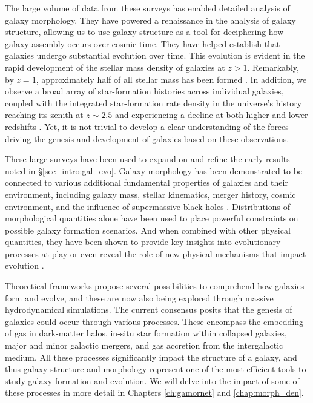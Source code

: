The large volume of data from these surveys has enabled detailed analysis of galaxy morphology. They have powered a renaissance in the analysis of galaxy structure, allowing us to use galaxy structure as a tool for deciphering how galaxy assembly occurs over cosmic time. They have helped establish that galaxies undergo substantial evolution over time. This evolution is evident in the rapid development of the stellar mass density of galaxies at $z > 1$. Remarkably, by $z = 1$, approximately half of all stellar mass has been formed \citep[e.g.,][]{bundy_05,mortlock_11}. In addition, we observe a broad array of star-formation histories across individual galaxies, coupled with the integrated star-formation rate density in the universe's history reaching its zenith at $z \sim 2.5$ and experiencing a decline at both higher and lower redshifts \citep[e.g.,][]{shapely_11, madau_dickinson_14}. Yet, it is not trivial to develop  a clear understanding of the forces driving the genesis and development of galaxies based on these observations. 

These large surveys have been used to expand on and refine the early results noted in \S \ref{sec_intro:gal_evo}. Galaxy morphology has been demonstrated to be connected to various additional fundamental properties of galaxies and their environment, including galaxy mass, stellar kinematics, merger history, cosmic environment, and the influence of supermassive black holes \citep[e.g.,][]{Tremaine2002TheCorrelation, pozzetti_10, wuyts_11, Huertas-Company2016MassCANDELS,powell_17, shimakawa_2021, Dimauro2022CoincidenceGrowth}. Distributions of morphological quantities alone have been used to place powerful constraints on possible galaxy formation scenarios. And when combined with other physical quantities, they have been shown to provide key insights into evolutionary processes at play or even reveal the role of new physical  mechanisms that impact evolution \citep[e.g.,][]{Kauffmann2004TheGalaxies,Weinmann2006PropertiesMass,Schawinski2007TheGalaxies,vanderWel2008TheMass,Schawinski2014TheGalaxies}.

Theoretical frameworks propose several possibilities to comprehend how galaxies form and evolve, and these are now also being explored through massive hydrodynamical simulations. The current consensus posits that the genesis of galaxies could occur through various processes. These encompass the embedding of gas in dark-matter halos, in-situ star formation within collapsed galaxies, major and minor galactic mergers, and gas accretion from the intergalactic medium. All these processes significantly impact the structure of a galaxy, and thus galaxy structure and morphology represent one of the most efficient tools to study galaxy formation and evolution. We will delve into the impact of some of these processes in more detail in Chapters \ref{ch:gamornet} and \ref{chap:morph_den}. 


